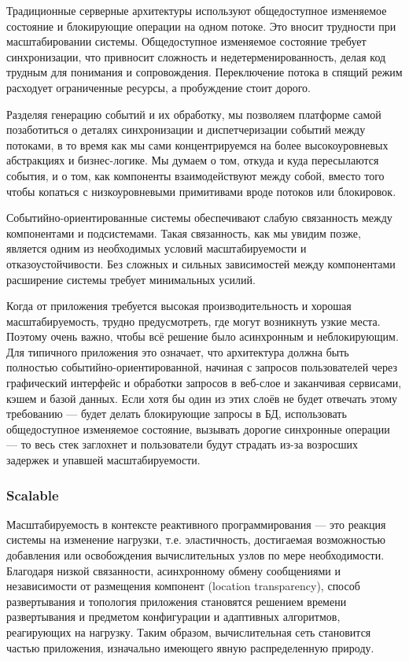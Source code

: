 Традиционные серверные архитектуры используют общедоступное изменяемое состояние и блокирующие операции на одном потоке. Это вносит трудности при масштабировании системы. Общедоступное изменяемое состояние требует синхронизации, что привносит сложность и недетерменированность, делая код трудным для понимания и сопровождения. Переключение потока в спящий режим расходует ограниченные ресурсы, а пробуждение стоит дорого.

Разделяя генерацию событий и их обработку, мы позволяем платформе самой позаботиться о деталях синхронизации и диспетчеризации событий между потоками, в то время как мы сами концентрируемся на более высокоуровневых абстракциях и бизнес-логике. Мы думаем о том, откуда и куда пересылаются события, и о том, как компоненты взаимодействуют между собой, вместо того чтобы копаться с низкоуровневыми примитивами вроде потоков или блокировок.

Событийно-ориентированные системы обеспечивают слабую связанность между компонентами и подсистемами. Такая связанность, как мы увидим позже, является одним из необходимых условий масштабируемости и отказоустойчивости. Без сложных и сильных зависимостей между компонентами расширение системы требует минимальных усилий.

Когда от приложения требуется высокая производительность и хорошая масштабируемость, трудно предусмотреть, где могут возникнуть узкие места. Поэтому очень важно, чтобы всё решение было асинхронным и неблокирующим. Для типичного приложения это означает, что архитектура должна быть полностью событийно-ориентированной, начиная с запросов пользователей через графический интерфейс и обработки запросов в веб-слое и заканчивая сервисами, кэшем и базой данных. Если хотя бы один из этих слоёв не будет отвечать этому требованию --- будет делать блокирующие запросы в БД, использовать общедоступное изменяемое состояние, вызывать дорогие синхронные операции --- то весь стек заглохнет и пользователи будут страдать из-за возросших задержек и упавшей масштабируемости.

\subsubsection{Scalable}
\label{subsub:domain:reactive_programming:scalable}

Масштабируемость в контексте реактивного программирования --- это реакция системы на изменение нагрузки, т.е. эластичность, достигаемая возможностью добавления или освобождения вычислительных узлов по мере необходимости. Благодаря низкой связанности, асинхронному обмену сообщениями и независимости от размещения компонент (location transparency), способ развертывания и топология приложения становятся решением времени развертывания и предметом конфигурации и адаптивных алгоритмов, реагирующих на нагрузку. Таким образом, вычислительная сеть становится частью приложения, изначально имеющего явную распределенную природу.

